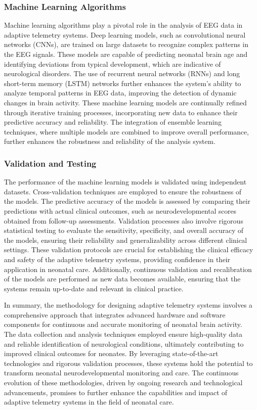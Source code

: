 \documentclass[12pt,journal,compsoc]{IEEEtran}
\begin{document}
\subsubsection{Machine Learning Algorithms}

Machine learning algorithms play a pivotal role in the analysis of EEG data in adaptive telemetry systems. Deep learning models, such as convolutional neural networks (CNNs), are trained on large datasets to recognize complex patterns in the EEG signals. These models are capable of predicting neonatal brain age and identifying deviations from typical development, which are indicative of neurological disorders. The use of recurrent neural networks (RNNs) and long short-term memory (LSTM) networks further enhances the system's ability to analyze temporal patterns in EEG data, improving the detection of dynamic changes in brain activity. These machine learning models are continually refined through iterative training processes, incorporating new data to enhance their predictive accuracy and reliability. The integration of ensemble learning techniques, where multiple models are combined to improve overall performance, further enhances the robustness and reliability of the analysis system.

\subsubsection{Validation and Testing}

The performance of the machine learning models is validated using independent datasets. Cross-validation techniques are employed to ensure the robustness of the models. The predictive accuracy of the models is assessed by comparing their predictions with actual clinical outcomes, such as neurodevelopmental scores obtained from follow-up assessments. Validation processes also involve rigorous statistical testing to evaluate the sensitivity, specificity, and overall accuracy of the models, ensuring their reliability and generalizability across different clinical settings. These validation protocols are crucial for establishing the clinical efficacy and safety of the adaptive telemetry systems, providing confidence in their application in neonatal care. Additionally, continuous validation and recalibration of the models are performed as new data becomes available, ensuring that the systems remain up-to-date and relevant in clinical practice.

In summary, the methodology for designing adaptive telemetry systems involves a comprehensive approach that integrates advanced hardware and software components for continuous and accurate monitoring of neonatal brain activity. The data collection and analysis techniques employed ensure high-quality data and reliable identification of neurological conditions, ultimately contributing to improved clinical outcomes for neonates. By leveraging state-of-the-art technologies and rigorous validation processes, these systems hold the potential to transform neonatal neurodevelopmental monitoring and care. The continuous evolution of these methodologies, driven by ongoing research and technological advancements, promises to further enhance the capabilities and impact of adaptive telemetry systems in the field of neonatal care.
\end{document}

